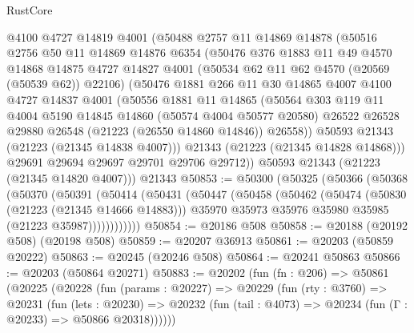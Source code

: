 \begin{lexlean}{RustCore}
\begin{coremodule}
      @4100
      @4727
      @14819
      @4001
      (@50488
        @2757
        @11
        @14869
        @14878
        (@50516
          @2756
          @50
          @11
          @14869
          @14876
          @6354
          (@50476
            @376
            @1883
            @11
            @49
            @4570
            @14868
            @14875
            @4727
            @14827
            @4001
            (@50534 @62 @11 @62 @4570 (@20569 (@50539 @62)) @22106)
            (@50476
              @1881
              @266
              @11
              @30
              @14865
              @4007
              @4100
              @4727
              @14837
              @4001
              (@50556
                @1881
                @11
                @14865
                (@50564
                  @303
                  @119
                  @11
                  @4004
                  @5190
                  @14845
                  @14860
                  (@50574 @4004 @50577 @20580)
                  @26522
                  @26528
                  @29880
                  @26548
                  (@21223 (@26550 @14860 @14846))
                  @26558))
              @50593
              @21343
              (@21223 (@21345 @14838 @4007)))
            @21343
            (@21223 (@21345 @14828 @14868)))
          @29691
          @29694
          @29697
          @29701
          @29706
          @29712))
      @50593
      @21343
      (@21223 (@21345 @14820 @4007)))
    @21343
@50853 := @50300
    (@50325
      (@50366
        (@50368
          (@50370
            (@50391
              (@50414
                (@50431
                  (@50447
                    (@50458
                      (@50462
                        (@50474
                          (@50830 (@21223 (@21345 @14666 @14883)))
                          @35970
                          @35973
                          @35976
                          @35980
                          @35985
                          (@21223 @35987))))))))))))
@50854 := @20186 @508
@50858 := @20188 (@20192 @508) (@20198 @508)
@50859 := @20207 @36913
@50861 := @20203 (@50859 @20222)
@50863 := @20245 (@20246 @508)
@50864 := @20241 @50863
@50866 := @20203 (@50864 @20271)
@50883 := @20202
    (fun (fn : @206) =>
    @50861
      (@20225
        (@20228
          (fun (params : @20227) =>
          @20229
            (fun (rty : @3760) =>
            @20231
              (fun (lets : @20230) =>
              @20232 (fun (tail : @4073) => @20234 (fun (Γ : @20233) => @50866 @20318))))))

\end{coremodule}
\end{lexlean}
